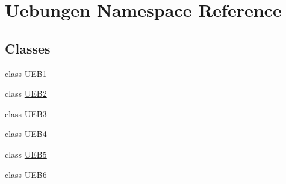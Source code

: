 \hypertarget{namespace_uebungen}{}\section{Uebungen Namespace Reference}
\label{namespace_uebungen}
\subsection*{Classes}
\begin{DoxyCompactItemize}
\item 
class \mbox{\hyperlink{class_uebungen_1_1_u_e_b1}{U\+E\+B1}}
\item 
class \mbox{\hyperlink{class_uebungen_1_1_u_e_b2}{U\+E\+B2}}
\item 
class \mbox{\hyperlink{class_uebungen_1_1_u_e_b3}{U\+E\+B3}}
\item 
class \mbox{\hyperlink{class_uebungen_1_1_u_e_b4}{U\+E\+B4}}
\item 
class \mbox{\hyperlink{class_uebungen_1_1_u_e_b5}{U\+E\+B5}}
\item 
class \mbox{\hyperlink{class_uebungen_1_1_u_e_b6}{U\+E\+B6}}
\end{DoxyCompactItemize}
